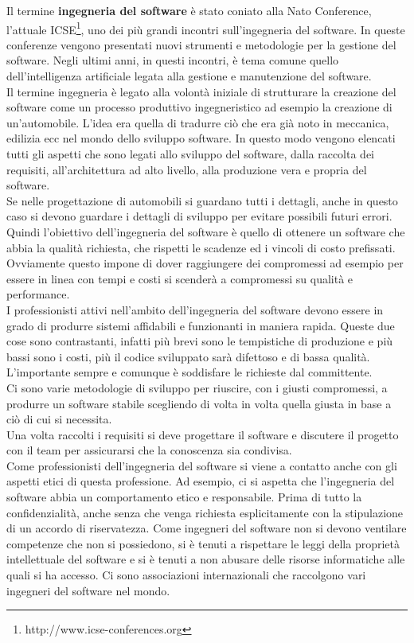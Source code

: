 Il termine \textbf{ingegneria del software} è stato coniato alla Nato Conference, l'attuale \acrfull{ICSE}\footnote{http://www.icse-conferences.org}, uno dei più grandi incontri sull'ingegneria del software.
In queste conferenze vengono presentati nuovi strumenti e metodologie per la gestione del software.
Negli ultimi anni, in questi incontri, è tema comune quello dell'intelligenza artificiale legata alla gestione e manutenzione del software.\\
Il termine ingegneria è legato alla volontà iniziale di strutturare la creazione del software come un processo produttivo ingegneristico ad esempio la creazione di un'automobile.
L'idea era quella di tradurre ciò che era già noto in meccanica, edilizia ecc nel mondo dello sviluppo software.
In questo modo vengono elencati tutti gli aspetti che sono legati allo sviluppo del software, dalla raccolta dei requisiti, all'architettura ad alto livello, alla produzione vera e propria del software.\\
Se nelle progettazione di automobili si guardano tutti i dettagli, anche in questo caso si devono guardare i dettagli di sviluppo per evitare possibili futuri errori.\\
Quindi l'obiettivo dell'ingegneria del software è quello di ottenere un software che abbia la qualità richiesta, che rispetti le scadenze ed i vincoli di costo prefissati.\\
Ovviamente questo impone di dover raggiungere dei compromessi ad esempio per essere in linea con tempi e costi si scenderà a compromessi su qualità e performance.\\
I professionisti attivi nell'ambito dell'ingegneria del software devono essere in grado di produrre sistemi affidabili e funzionanti in maniera rapida.
Queste due cose sono contrastanti, infatti più brevi sono le tempistiche di produzione e più bassi sono i costi, più il codice sviluppato sarà difettoso e di bassa qualità.
L'importante sempre e comunque è soddisfare le richieste dal committente.\\
Ci sono varie metodologie di sviluppo per riuscire, con i giusti compromessi, a produrre un software stabile scegliendo di volta in volta quella giusta in base a ciò di cui si necessita.\\
Una volta raccolti i requisiti si deve progettare il software e discutere il progetto con il team per assicurarsi che la conoscenza sia condivisa.\\
Come professionisti dell'ingegneria del software si viene a contatto anche con gli aspetti etici di questa professione.
Ad esempio, ci si aspetta che l'ingegneria del software abbia un comportamento etico e responsabile.
Prima di tutto la confidenzialità, anche senza che venga richiesta esplicitamente con la stipulazione di un accordo di riservatezza.
Come ingegneri del software non si devono ventilare competenze che non si possiedono, si è tenuti a rispettare le leggi della proprietà intellettuale del software e si è tenuti a non abusare delle risorse informatiche alle quali si ha accesso.
Ci sono associazioni internazionali che raccolgono vari ingegneri del software nel mondo.